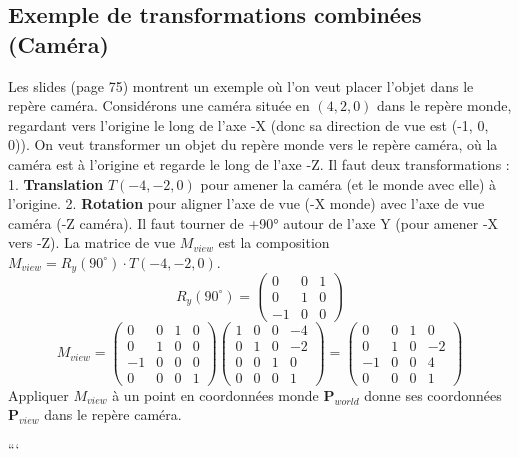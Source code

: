 \subsection{Exemple de transformations combinées (Caméra)}
Les slides (page 75) montrent un exemple où l'on veut placer l'objet dans le repère caméra.
Considérons une caméra située en \( (4, 2, 0) \) dans le repère monde, regardant vers l'origine le long de l'axe -X (donc sa direction de vue est (-1, 0, 0)). On veut transformer un objet du repère monde vers le repère caméra, où la caméra est à l'origine et regarde le long de l'axe -Z.
Il faut deux transformations :
1.  \textbf{Translation} \( T(-4, -2, 0) \) pour amener la caméra (et le monde avec elle) à l'origine.
2.  \textbf{Rotation} pour aligner l'axe de vue (-X monde) avec l'axe de vue caméra (-Z caméra). Il faut tourner de +90° autour de l'axe Y (pour amener -X vers -Z).
La matrice de vue \( M_{view} \) est la composition \( M_{view} = R_y(90^\circ) \cdot T(-4, -2, 0) \).
\[ R_y(90^\circ) = \begin{pmatrix} 0 & 0 & 1 \\ 0 & 1 & 0 \\ -1 & 0 & 0 \end{pmatrix} \]
\[ M_{view} = \begin{pmatrix} 0 & 0 & 1 & 0 \\ 0 & 1 & 0 & 0 \\ -1 & 0 & 0 & 0 \\ 0 & 0 & 0 & 1 \end{pmatrix} \begin{pmatrix} 1 & 0 & 0 & -4 \\ 0 & 1 & 0 & -2 \\ 0 & 0 & 1 & 0 \\ 0 & 0 & 0 & 1 \end{pmatrix} = \begin{pmatrix} 0 & 0 & 1 & 0 \\ 0 & 1 & 0 & -2 \\ -1 & 0 & 0 & 4 \\ 0 & 0 & 0 & 1 \end{pmatrix} \]
Appliquer \( M_{view} \) à un point en coordonnées monde \( \mathbf{P}_{world} \) donne ses coordonnées \( \mathbf{P}_{view} \) dans le repère caméra.

```